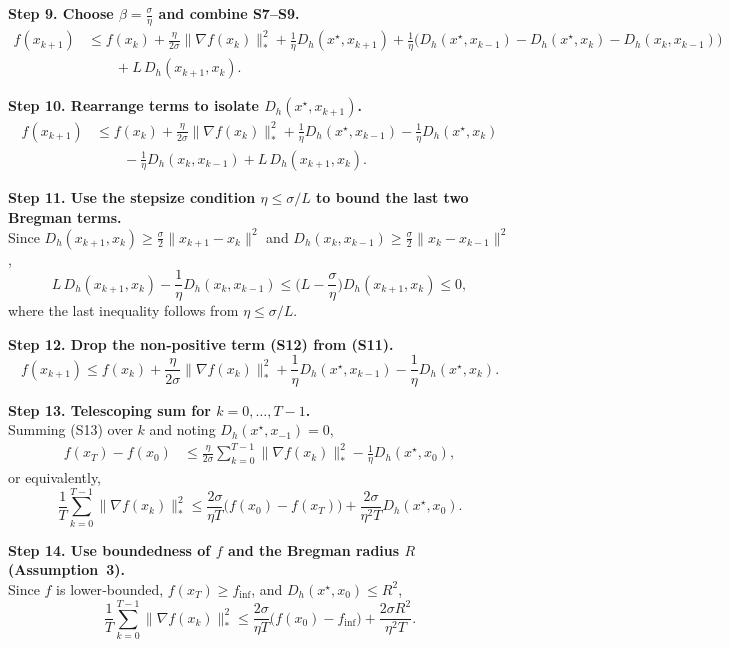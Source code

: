 \documentclass{article}
\begin{document}
\noindent\textbf{Step 9. Choose $\beta=\frac{\sigma}{\eta}$ and combine S7–S9.}
\[
\begin{aligned}
f(x_{k+1})
&\le f(x_k)+\frac{\eta}{2\sigma}\|\nabla f(x_k)\|_{*}^{2}
   +\frac{1}{\eta}D_h(x^{\star},x_{k+1})
   +\frac{1}{\eta}\Big(D_h(x^{\star},x_{k-1})-D_h(x^{\star},x_k)-D_h(x_k,x_{k-1})\Big)\\
&\qquad +L\,D_h(x_{k+1},x_k).
\end{aligned}
\tag{S10}
\]

\noindent\textbf{Step 10. Rearrange terms to isolate $D_h(x^{\star},x_{k+1})$.}
\[
\begin{aligned}
f(x_{k+1})
&\le f(x_k)+\frac{\eta}{2\sigma}\|\nabla f(x_k)\|_{*}^{2}
   +\frac{1}{\eta}D_h(x^{\star},x_{k-1})
   -\frac{1}{\eta}D_h(x^{\star},x_k)\\
&\qquad -\frac{1}{\eta}D_h(x_k,x_{k-1})
   +L\,D_h(x_{k+1},x_k).
\end{aligned}
\tag{S11}
\]

\noindent\textbf{Step 11. Use the stepsize condition $\eta\le\sigma/L$ to bound the last two Bregman terms.}\\
Since $D_h(x_{k+1},x_k)\ge\frac{\sigma}{2}\|x_{k+1}-x_k\|^{2}$ and $D_h(x_k,x_{k-1})\ge\frac{\sigma}{2}\|x_k-x_{k-1}\|^{2}$,
\[
L\,D_h(x_{k+1},x_k)-\frac{1}{\eta}D_h(x_k,x_{k-1})
\le\Big(L-\frac{\sigma}{\eta}\Big)D_h(x_{k+1},x_k)\le0,
\tag{S12}
\]
where the last inequality follows from $\eta\le\sigma/L$.

\noindent\textbf{Step 12. Drop the non‑positive term (S12) from (S11).}
\[
f(x_{k+1})\le f(x_k)+\frac{\eta}{2\sigma}\|\nabla f(x_k)\|_{*}^{2}
   +\frac{1}{\eta}D_h(x^{\star},x_{k-1})-\frac{1}{\eta}D_h(x^{\star},x_k).
\tag{S13}
\]

\noindent\textbf{Step 13. Telescoping sum for $k=0,\dots,T-1$.}\\
Summing (S13) over $k$ and noting $D_h(x^{\star},x_{-1})=0$,
\[
\begin{aligned}
f(x_T)-f(x_0)
&\le\frac{\eta}{2\sigma}\sum_{k=0}^{T-1}\|\nabla f(x_k)\|_{*}^{2}
   -\frac{1}{\eta}D_h(x^{\star},x_0),
\end{aligned}
\tag{S14}
\]
or equivalently,
\[
\frac{1}{T}\sum_{k=0}^{T-1}\|\nabla f(x_k)\|_{*}^{2}
\le\frac{2\sigma}{\eta T}\big(f(x_0)-f(x_T)\big)+\frac{2\sigma}{\eta^{2}T}D_h(x^{\star},x_0).
\tag{S15}
\]

\noindent\textbf{Step 14. Use boundedness of $f$ and the Bregman radius $R$ (Assumption~3).}\\
Since $f$ is lower‑bounded, $f(x_T)\ge f_{\inf}$, and $D_h(x^{\star},x_0)\le R^{2}$,
\[
\frac{1}{T}\sum_{k=0}^{T-1}\|\nabla f(x_k)\|_{*}^{2}
\le\frac{2\sigma}{\eta T}\big(f(x_0)-f_{\inf}\big)+\frac{2\sigma R^{2}}{\eta^{2}T}.
\tag{S16}
\]
\end{document}
